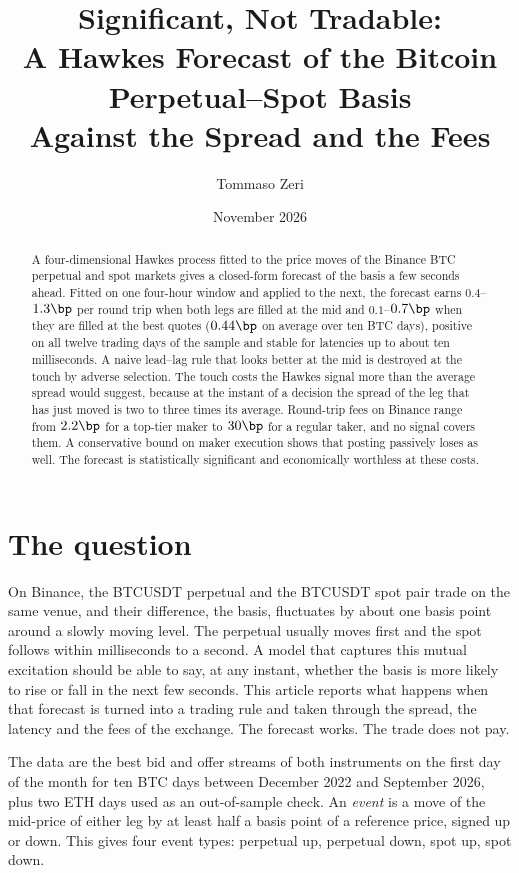\documentclass[a4paper,11pt]{article}
\title{Significant, Not Tradable:\\[2pt]
\large A Hawkes Forecast of the Bitcoin Perpetual--Spot Basis\\ Against the Spread and the Fees}
\author{Tommaso Zeri}
\date{November 2026}
\begin{document}
\maketitle

\begin{abstract}
\noindent
A four-dimensional Hawkes process fitted to the price moves of the Binance BTC perpetual and spot markets gives a closed-form forecast of the basis a few seconds ahead. Fitted on one four-hour window and applied to the next, the forecast earns $0.4$--$1.3\bp$ per round trip when both legs are filled at the mid and $0.1$--$0.7\bp$ when they are filled at the best quotes ($0.44\bp$ on average over ten BTC days), positive on all twelve trading days of the sample and stable for latencies up to about ten milliseconds. A naive lead--lag rule that looks better at the mid is destroyed at the touch by adverse selection. The touch costs the Hawkes signal more than the average spread would suggest, because at the instant of a decision the spread of the leg that has just moved is two to three times its average. Round-trip fees on Binance range from $2.2\bp$ for a top-tier maker to $30\bp$ for a regular taker, and no signal covers them. A conservative bound on maker execution shows that posting passively loses as well. The forecast is statistically significant and economically worthless at these costs.
\end{abstract}

\section{The question}

On Binance, the BTCUSDT perpetual and the BTCUSDT spot pair trade on the same venue, and their difference, the basis, fluctuates by about one basis point around a slowly moving level. The perpetual usually moves first and the spot follows within milliseconds to a second. A model that captures this mutual excitation should be able to say, at any instant, whether the basis is more likely to rise or fall in the next few seconds. This article reports what happens when that forecast is turned into a trading rule and taken through the spread, the latency and the fees of the exchange. The forecast works. The trade does not pay.

The data are the best bid and offer streams of both instruments on the first day of the month for ten BTC days between December 2022 and September 2026, plus two ETH days used as an out-of-sample check. An \emph{event} is a move of the mid-price of either leg by at least half a basis point of a reference price, signed up or down. This gives four event types: perpetual up, perpetual down, spot up, spot down.
\end{document}

